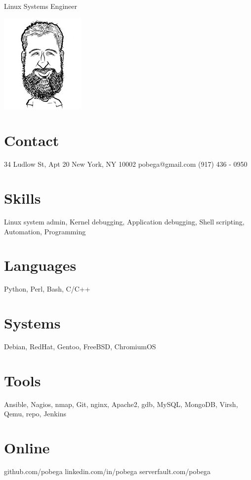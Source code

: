 \documentclass[]{resume}
\begin{document}
\graphicspath{ {images/} }

       {Linux Systems Engineer}


\begin{aside}
  \includegraphics{caricaturesmall}
  \section{Contact}
    34 Ludlow St, Apt 20
    New York, NY 10002
    pobega@gmail.com
    (917) 436 - 0950
  \section{Skills}
    Linux system admin, 
    Kernel debugging,
    Application debugging,
    Shell scripting, Automation, Programming
  \section{Languages}
    Python, Perl, Bash,
    C/C++
  \section{Systems}
    Debian, RedHat, Gentoo,
    FreeBSD, ChromiumOS
  \section{Tools}
	Ansible, Nagios, nmap, Git, nginx, Apache2, gdb, MySQL, MongoDB, Virsh, Qemu, repo, Jenkins
  \section{Online}
    github.com/{\bodyfontbold pobega}
    linkedin.com/in/{\bodyfontbold pobega}
    serverfault.com/{\bodyfontbold pobega}
\end{aside}
\end{document}
